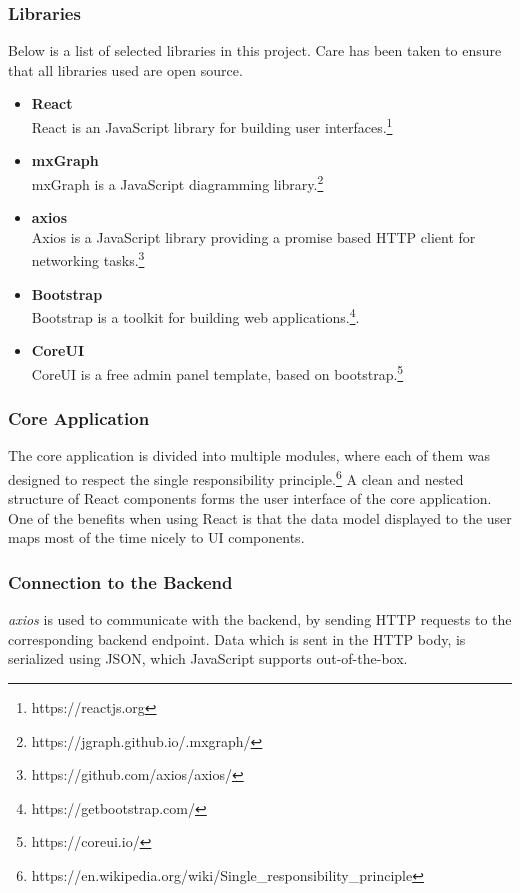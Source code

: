\documentclass[a4paper,top=25mm,bottom=25mm,12pt,pdftex,halfparskip,twoside,bibtotoc,numbers=noenddot]{scrbook}
\begin{document}
\subsubsection{Libraries}
Below is a list of selected libraries in this project. Care has been taken to ensure that all libraries used are open source.
\begin{itemize}
\item \textbf{React}\\
React is an JavaScript library for building user interfaces.\footnote{https://reactjs.org}
\item \textbf{mxGraph}\\
mxGraph is a JavaScript diagramming library.\footnote{https://jgraph.github.io/.mxgraph/}
\item \textbf{axios}\\
Axios is a JavaScript library providing a promise based HTTP client for networking tasks.\footnote{https://github.com/axios/axios/}
\item \textbf{Bootstrap}\\
Bootstrap is a toolkit for building web applications.\footnote{https://getbootstrap.com/}.
\item \textbf{CoreUI}\\
CoreUI is a free admin panel template, based on bootstrap.\footnote{https://coreui.io/}
\end{itemize}

\subsubsection{Core Application}

The core application is divided into multiple modules, where each of them was designed to respect the single responsibility principle.\footnote{https://en.wikipedia.org/wiki/Single\_responsibility\_principle} A clean and nested structure of React components forms the user interface of the core  application. One of the benefits when using React is that the data model displayed to the user maps most of the time nicely to UI components.

\subsubsection{Connection to the Backend}

\textit{axios} is used to communicate with the backend, by sending HTTP requests to the corresponding backend endpoint. Data which is sent in the HTTP body, is serialized using JSON, which JavaScript supports out-of-the-box.
\end{document}
